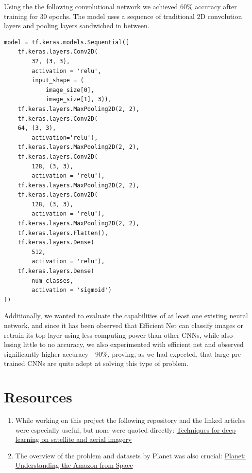 \documentclass[
	a4paper, %
	10pt, %
	unnumberedsections, %
	twoside, %
]{LTJournalArticle}
\begin{document}
Using the the following convolutional network we achieved 60\% accuracy after training for 30 epochs. The model uses a sequence of traditional 2D convolution layers and pooling layers sandwiched in between.

\begin{verbatim}
model = tf.keras.models.Sequential([
    tf.keras.layers.Conv2D(
        32, (3, 3), 
        activation = 'relu', 
        input_shape = (
            image_size[0], 
            image_size[1], 3)),
    tf.keras.layers.MaxPooling2D(2, 2),
    tf.keras.layers.Conv2D(
    64, (3, 3), 
        activation='relu'),
    tf.keras.layers.MaxPooling2D(2, 2),
    tf.keras.layers.Conv2D(
        128, (3, 3), 
        activation = 'relu'),
    tf.keras.layers.MaxPooling2D(2, 2),
    tf.keras.layers.Conv2D(
        128, (3, 3), 
        activation = 'relu'),
    tf.keras.layers.MaxPooling2D(2, 2),
    tf.keras.layers.Flatten(),
    tf.keras.layers.Dense(
        512, 
        activation = 'relu'),
    tf.keras.layers.Dense(
        num_classes, 
        activation = 'sigmoid')
])
\end{verbatim}

Additionally, we wanted to evaluate the capabilities of at least one existing neural network, and since it has been observed that Efficient Net can classify images or retrain its top layer using less computing power than other CNNs, while also losing little to no accuracy, we also experimented with efficient net and observed significantly higher accuracy - 90\%, proving, as we had expected, that large pre-trained CNNs are quite adept at solving this type of problem.



\section{Resources}

\begin{enumerate}
    \item While working on this project the following repository and the linked articles were especially useful, but none were quoted directly: \href{https://github.com/satellite-image-deep-learning/techniques#1-classification}{Techniques for deep learning on satellite and aerial imagery}

    \item The overview of the problem and datasets by Planet was also crucial: \href{https://www.kaggle.com/competitions/planet-understanding-the-amazon-from-space/overview}{Planet: Understanding the Amazon from Space}
\end{enumerate}
 
\printbibliography %

\end{document}
